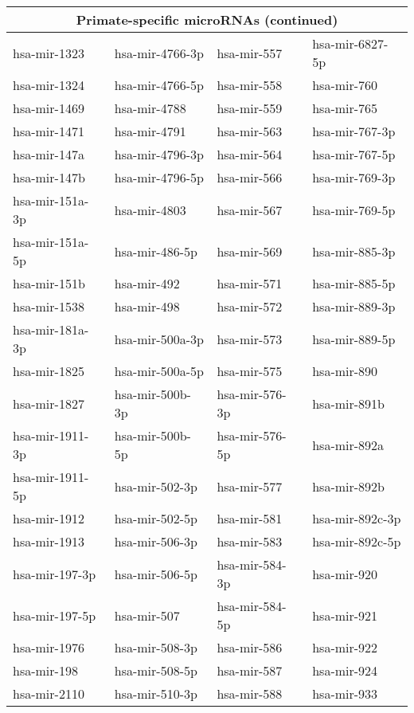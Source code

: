 \begin{table}
\centering
\vfill
\begin{tabular}{|l|l|l|l|}
\hline
\multicolumn{4}{|c|}{\bf Primate-specific microRNAs (continued)} \\
\hline
  \hline
  hsa-mir-1323 & hsa-mir-4766-3p & hsa-mir-557 & hsa-mir-6827-5p \\ 
  hsa-mir-1324 & hsa-mir-4766-5p & hsa-mir-558 & hsa-mir-760 \\ 
  hsa-mir-1469 & hsa-mir-4788 & hsa-mir-559 & hsa-mir-765 \\ 
  hsa-mir-1471 & hsa-mir-4791 & hsa-mir-563 & hsa-mir-767-3p \\ 
  hsa-mir-147a & hsa-mir-4796-3p & hsa-mir-564 & hsa-mir-767-5p \\ 
  hsa-mir-147b & hsa-mir-4796-5p & hsa-mir-566 & hsa-mir-769-3p \\ 
  hsa-mir-151a-3p & hsa-mir-4803 & hsa-mir-567 & hsa-mir-769-5p \\ 
  hsa-mir-151a-5p & hsa-mir-486-5p & hsa-mir-569 & hsa-mir-885-3p \\ 
  hsa-mir-151b & hsa-mir-492 & hsa-mir-571 & hsa-mir-885-5p \\ 
  hsa-mir-1538 & hsa-mir-498 & hsa-mir-572 & hsa-mir-889-3p \\ 
  hsa-mir-181a-3p & hsa-mir-500a-3p & hsa-mir-573 & hsa-mir-889-5p \\ 
  hsa-mir-1825 & hsa-mir-500a-5p & hsa-mir-575 & hsa-mir-890 \\ 
  hsa-mir-1827 & hsa-mir-500b-3p & hsa-mir-576-3p & hsa-mir-891b \\ 
  hsa-mir-1911-3p & hsa-mir-500b-5p & hsa-mir-576-5p & hsa-mir-892a \\ 
  hsa-mir-1911-5p & hsa-mir-502-3p & hsa-mir-577 & hsa-mir-892b \\ 
  hsa-mir-1912 & hsa-mir-502-5p & hsa-mir-581 & hsa-mir-892c-3p \\ 
  hsa-mir-1913 & hsa-mir-506-3p & hsa-mir-583 & hsa-mir-892c-5p \\ 
  hsa-mir-197-3p & hsa-mir-506-5p & hsa-mir-584-3p & hsa-mir-920 \\ 
  hsa-mir-197-5p & hsa-mir-507 & hsa-mir-584-5p & hsa-mir-921 \\ 
  hsa-mir-1976 & hsa-mir-508-3p & hsa-mir-586 & hsa-mir-922 \\ 
  hsa-mir-198 & hsa-mir-508-5p & hsa-mir-587 & hsa-mir-924 \\ 
  hsa-mir-2110 & hsa-mir-510-3p & hsa-mir-588 & hsa-mir-933 \\ 

\end{tabular}
\end{table}
